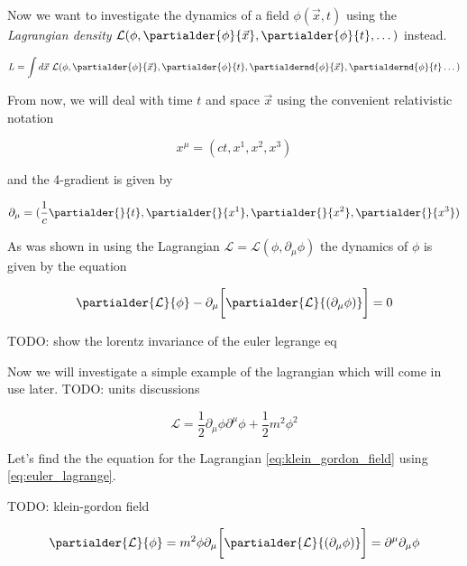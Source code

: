 Now we want to investigate the dynamics of a field $\phi(\vec{x}, t)$ using the \textit{Lagrangian density}
$\mathcal{L}(\phi, \partialder{\phi}{\vec{x}}, \partialder{\phi}{t}, \dots)$ instead.

\begin{equation}
    \label{eq:lagrangian_density}
    L = \int d\vec{x} \ \mathcal{L}(\phi, \partialder{\phi}{\vec{x}}, \partialder{\phi}{t}, \partialdernd{\phi}{\vec{x}}, \partialdernd{\phi}{t} \dots)
\end{equation}

From now, we will deal with time $t$ and space $\vec{x}$ using the convenient relativistic notation

\begin{equation*}
    x^{\mu} = (ct, x^{1}, x^{2}, x^{3})
\end{equation*}
    
and the 4-gradient is given by 

\begin{equation*}
    \partial_{\mu} = (\frac{1}{c} \partialder{}{t}, \partialder{}{x^{1}}, \partialder{}{x^{2}}, \partialder{}{x^{3}})
\end{equation*}

As was shown in \cite{goldstein} using the Lagrangian $\mathcal{L} = \mathcal{L}(\phi, \partial_{\mu} \phi)$ the dynamics of $\phi$ is given 
by the equation

\begin{equation}
    \label{eq:euler_lagrange}
    \partialder{\mathcal{L}}{\phi} - \partial_{\mu} \bigg[ \partialder{\mathcal{L}}{(\partial_{\mu} \phi)} \bigg] = 0
\end{equation}

TODO: show the lorentz invariance of the euler legrange eq

Now we will investigate a simple example of the lagrangian which will come in use later. TODO: units discussions

\begin{equation}
    \label{eq:klein_gordon_field}
    \mathcal{L} = \frac{1}{2} \partial_{\mu} \phi \partial^{\mu} \phi + \frac{1}{2} m^{2} \phi^{2}
\end{equation}

Let's find the the equation for the Lagrangian \ref{eq:klein_gordon_field} using \ref{eq:euler_lagrange}.

TODO: klein-gordon field

\begin{equation*}
    \begin{gathered}
        \partialder{\mathcal{L}}{\phi} = m^2 \phi
        \partial_{\mu} \bigg[ \partialder{\mathcal{L}}{(\partial_{\mu} \phi)} \bigg] = \partial^{\mu} \partial_{\mu} \phi
    \end{gathered}
\end{equation*}

